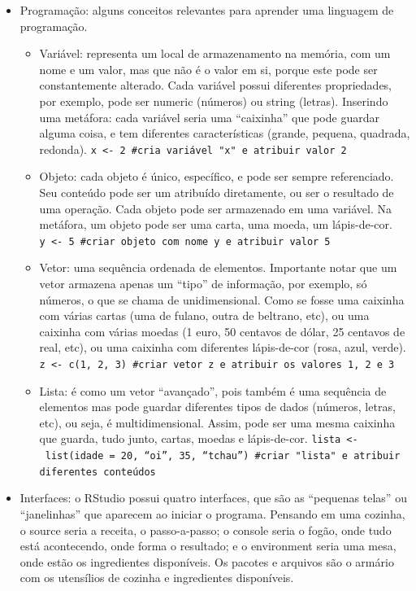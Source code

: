 \documentclass[
  brazil,
]{book}
\providecommand{\tightlist}{%
  \setlength{\itemsep}{0pt}\setlength{\parskip}{0pt}}
\begin{document}
\begin{itemize}
\tightlist
\item
  Programação: alguns conceitos relevantes para aprender uma linguagem de programação.

  \begin{itemize}
  \tightlist
  \item
    Variável: representa um local de armazenamento na memória, com um nome e um valor, mas que não é o valor em si, porque este pode ser constantemente alterado. Cada variável possui diferentes propriedades, por exemplo, pode ser numeric (números) ou string (letras). Inserindo uma metáfora: cada variável seria uma ``caixinha'' que pode guardar alguma coisa, e tem diferentes características (grande, pequena, quadrada, redonda). \texttt{x\ \textless{}-\ 2\ \#cria\ variável\ "x"\ e\ atribuir\ valor\ 2}
  \item
    Objeto: cada objeto é único, específico, e pode ser sempre referenciado. Seu conteúdo pode ser um atribuído diretamente, ou ser o resultado de uma operação. Cada objeto pode ser armazenado em uma variável. Na metáfora, um objeto pode ser uma carta, uma moeda, um lápis-de-cor. \texttt{y\ \textless{}-\ 5\ \#criar\ objeto\ com\ nome\ y\ e\ atribuir\ valor\ 5}
  \item
    Vetor: uma sequência ordenada de elementos. Importante notar que um vetor armazena apenas um ``tipo'' de informação, por exemplo, só números, o que se chama de unidimensional. Como se fosse uma caixinha com várias cartas (uma de fulano, outra de beltrano, etc), ou uma caixinha com várias moedas (1 euro, 50 centavos de dólar, 25 centavos de real, etc), ou uma caixinha com diferentes lápis-de-cor (rosa, azul, verde). \texttt{z\ \textless{}-\ c(1,\ 2,\ 3)\ \#criar\ vetor\ z\ e\ atribuir\ os\ valores\ 1,\ 2\ e\ 3}
  \item
    Lista: é como um vetor ``avançado'', pois também é uma sequência de elementos mas pode guardar diferentes tipos de dados (números, letras, etc), ou seja, é multidimensional. Assim, pode ser uma mesma caixinha que guarda, tudo junto, cartas, moedas e lápis-de-cor. \texttt{lista\ \textless{}-\ list(idade\ =\ 20,\ “oi”,\ 35,\ “tchau”)\ \#criar\ "lista"\ e\ atribuir\ diferentes\ conteúdos}
  \end{itemize}
\item
  Interfaces: o RStudio possui quatro interfaces, que são as ``pequenas telas'' ou ``janelinhas'' que aparecem ao iniciar o programa. Pensando em uma cozinha, o source seria a receita, o passo-a-passo; o console seria o fogão, onde tudo está acontecendo, onde forma o resultado; e o environment seria uma mesa, onde estão os ingredientes disponíveis. Os pacotes e arquivos são o armário com os utensílios de cozinha e ingredientes disponíveis.


\end{itemize}
\end{document}
